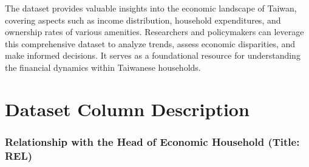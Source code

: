 \documentclass[twocolumn]{article}
\begin{document}
The dataset provides valuable insights into the economic landscape of Taiwan, covering aspects such as income distribution, household expenditures, and ownership rates of various amenities. Researchers and policymakers can leverage this comprehensive dataset to analyze trends, assess economic disparities, and make informed decisions. It serves as a foundational resource for understanding the financial dynamics within Taiwanese households.
\section{Dataset Column Description}
	\subsubsection{Relationship with the Head of Economic Household (Title: REL)}
		
\end{document}
